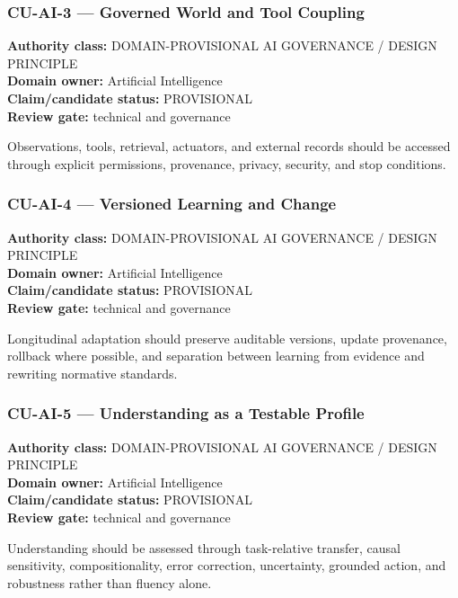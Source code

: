 \documentclass[
  11pt,
]{article}
\begin{document}
\subsubsection{CU-AI-3 --- Governed World and Tool
Coupling}\label{cu-ai-3-governed-world-and-tool-coupling}

\textbf{Authority class:} DOMAIN-PROVISIONAL AI GOVERNANCE / DESIGN
PRINCIPLE\\
\textbf{Domain owner:} Artificial Intelligence\\
\textbf{Claim/candidate status:} PROVISIONAL\\
\textbf{Review gate:} technical and governance

Observations, tools, retrieval, actuators, and external records should
be accessed through explicit permissions, provenance, privacy, security,
and stop conditions.

\subsubsection{CU-AI-4 --- Versioned Learning and
Change}\label{cu-ai-4-versioned-learning-and-change}

\textbf{Authority class:} DOMAIN-PROVISIONAL AI GOVERNANCE / DESIGN
PRINCIPLE\\
\textbf{Domain owner:} Artificial Intelligence\\
\textbf{Claim/candidate status:} PROVISIONAL\\
\textbf{Review gate:} technical and governance

Longitudinal adaptation should preserve auditable versions, update
provenance, rollback where possible, and separation between learning
from evidence and rewriting normative standards.

\subsubsection{CU-AI-5 --- Understanding as a Testable
Profile}\label{cu-ai-5-understanding-as-a-testable-profile}

\textbf{Authority class:} DOMAIN-PROVISIONAL AI GOVERNANCE / DESIGN
PRINCIPLE\\
\textbf{Domain owner:} Artificial Intelligence\\
\textbf{Claim/candidate status:} PROVISIONAL\\
\textbf{Review gate:} technical and governance

Understanding should be assessed through task-relative transfer, causal
sensitivity, compositionality, error correction, uncertainty, grounded
action, and robustness rather than fluency alone.
\end{document}
